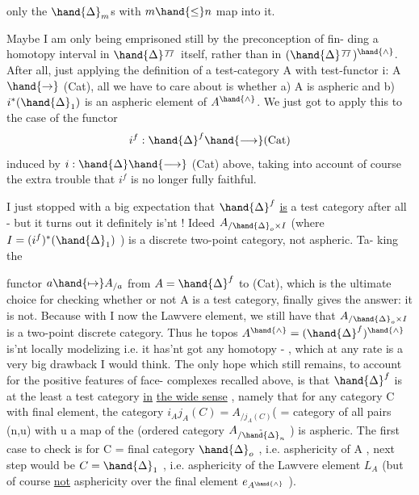only the $\hand{\Delta}_m$s with $m\hand{\leq} n$ map into it.

Maybe I am only being emprisoned still by the preconception of fin-%
ding a homotopy interval in $\hand{\Delta}^{\over{f}{f}}$ itself, rather than in $(\hand{\Delta}^{\over{f}{f}})^{\hand{\wedge}}$. After all,
just applying the definition of a test-category A with test-functor
i: A$\hand{\rightarrow}$ (Cat), all we have to care about is whether a) A is aspheric and
b) $i^*(\hand{\Delta}_1)$ is an aspheric element of $A^{\hand{\wedge}}$. We just got to apply this to the
case of the functor
\[ i^{f} : \hand{\Delta}^{f} \hand{\longrightarrow} (\mathrm{Cat}) \]
induced by $i : \hand{\Delta} \hand{\longrightarrow}$ (Cat) above, taking into account of course the
extra trouble that $i^{f}$ is no longer fully faithful.

I just stopped  with a big expectation that $\hand{\Delta}^{f}$ \uline{is} a test category
after all - but it turns out it definitely is'nt ! Ideed $A_{/\hand{\Delta}_{o}\times I}$
(where $I =(i^{f})^{*}(\hand{\Delta}_1)$ ) is  a discrete two-point category, not aspheric. Ta-%
king the  functor $a \hand{\mapsto} A_{/a}$ from $A= \hand{\Delta}^{f}$ to (Cat), which is the
ultimate choice for checking whether or not A is a test category, finally
gives the answer: it is not. Because with I now the Lawvere element, we
still have that $A_{/\hand{\Delta}_{o}\times I}$ is a two-point discrete category. Thus he topos
$A^{\hand{\wedge}}= (\hand{\Delta}^{f})^{\hand{\wedge}}$ is'nt locally modelizing i.e. it has'nt got any homotopy -%
, which at any rate is a very big drawback I would think. The only
hope which still remains, to account for the positive features of face-%
complexes recalled above, is that $\hand{\Delta}^{f}$ is at the least a test category \uline{in}
\uline{the wide sense} , namely that for any category C with final element, the
category $i_A j_A(C) = A_{/j_A(C)}$( = category of all  pairs (n,u)\inserted{,} with
u a map of the (ordered\over{)}{)} category $A_{/\tilde{\hand{\Delta}}_n}$ ) is aspheric. The first case to
check is for C = final category $\hand{\Delta}_o$ , i.e.  asphericity of A ,
next step would be $C =\hand{\Delta}_1$ , i.e. asphericity of the Lawvere element $L_A$
(but of course \uline{not} asphericity over the final element $e_{A^{\hand{\wedge}}}$ \hand{!}).


